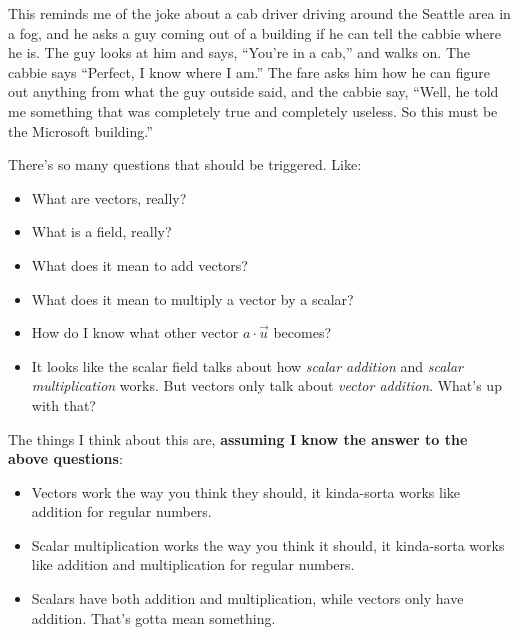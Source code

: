 \documentclass[
]{book}
\providecommand{\tightlist}{%
  \setlength{\itemsep}{0pt}\setlength{\parskip}{0pt}}
\begin{document}
This reminds me of the joke about a cab driver driving around the Seattle area in a fog, and he asks a guy coming out of a building if he can tell the cabbie where he is. The guy looks at him and says, ``You're in a cab,'' and walks on. The cabbie says ``Perfect, I know where I am.'' The fare asks him how he can figure out anything from what the guy outside said, and the cabbie say, ``Well, he told me something that was completely true and completely useless. So this must be the Microsoft building.''

There's so many questions that should be triggered. Like:

\begin{itemize}
\tightlist
\item
  What are vectors, really?
\item
  What is a field, really?
\item
  What does it mean to add vectors?
\item
  What does it mean to multiply a vector by a scalar?
\item
  How do I know what other vector \(a \cdot \vec{u}\) becomes?
\item
  It looks like the scalar field talks about how \emph{scalar addition} and \emph{scalar multiplication} works. But vectors only talk about \emph{vector addition}. What's up with that?
\end{itemize}

The things I think about this are, \textbf{assuming I know the answer to the above questions}:

\begin{itemize}
\tightlist
\item
  Vectors work the way you think they should, it kinda-sorta works like addition for regular numbers.
\item
  Scalar multiplication works the way you think it should, it kinda-sorta works like addition and multiplication for regular numbers.
\item
  Scalars have both addition and multiplication, while vectors only have addition. That's gotta mean something.
\end{itemize}

  
\end{document}
